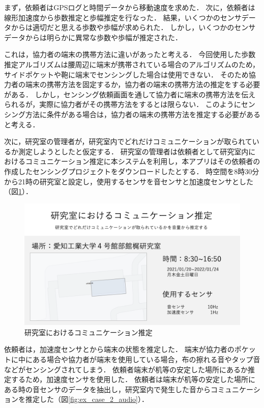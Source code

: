まず，依頼者はGPSログと時間データから移動速度を求めた．
次に，依頼者は線形加速度から歩数推定と歩幅推定を行なった．
結果，いくつかのセンサデータからは適切だと思える歩数や歩幅が求められた．
しかし，いくつかのセンサデータからは明らかに異常な歩数や歩幅が推定された．

これは，協力者の端末の携帯方法に違いがあったと考える．
今回使用した歩数推定アルゴリズムは腰周辺に端末が携帯されている場合のアルゴリズムのため，サイドポケットや鞄に端末でセンシングした場合は使用できない．
そのため協力者の端末の携帯方法を固定するか，協力者の端末の携帯方法の推定をする必要がある．
しかし，センシング依頼画面を通して協力者に端末の携帯方法を伝えられるが，実際に協力者がその携帯方法をするとは限らない．
このようにセンシング方法に条件がある場合は，協力者の端末の携帯方法を推定する必要があると考える．

次に，研究室の管理者が，研究室内でどれだけコミュニケーションが取られているか測定しようとしたと仮定する．
研究室の管理者は依頼者として研究室内におけるコミュニケーション推定に本システムを利用し，本アプリはその依頼者の作成したセンシングプロジェクトをダウンロードしたとする．
時空間を8時30分から21時の研究室と設定し，使用するセンサを音センサと加速度センサとした（図\ref{fig:ex_case_2}）．

\begin{figure}[tbh]
    \centering
    \includegraphics[width=16cm]{img_ex_case_2.png}
    \caption{研究室におけるコミュニケーション推定}
    \label{fig:ex_case_2}
\end{figure}

依頼者は，加速度センサとから端末の状態を推定した．
端末が協力者のポケットに中にある場合や協力者が端末を使用している場合，布の擦れる音やタップ音などがセンシングされてしまう．
依頼者端末が机等の安定した場所にあるか推定するため，加速度センサを使用した．
依頼者は端末が机等の安定した場所にある時の音センサのデータを抽出し，研究室内で発生した音からコミュニケーションを推定した（図\ref{fig:ex_case_2_audio}）．

